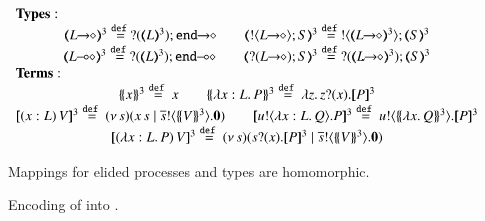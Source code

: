 \begin{figure}[t]
$
{%
\begin{array}{c}
	\multicolumn{1}{l}{\noindent{\bf Types:}}
	\\
	\tmap{\shot{L}}{3} \defeq \shot{\btinp{\tmap{L}{3}} \tinact}
	\qquad
	\tmap{\btout{\shot{L}} S}{3} \defeq \btout{\tmap{\shot{L}}{3}} \tmap{S}{3}
	\\
	\tmap{\lhot{L}}{3} \defeq \lhot{\btinp{\tmap{L}{3}} \tinact}
	\qquad \tmap{\btinp{\shot{L}} S}{3} \defeq \btinp{\tmap{\shot{L}}{3}} \tmap{S}{3}
	\\
	\multicolumn{1}{l}{\noindent{\bf Terms:}}
	\\
	\auxmap{x}{3} \defeq x
	\qquad
	\auxmap{\abs{x: L}{P}}{3} \defeq \abs{z}{\binp{z}{x} \pmap{P}{3}}
	\\
	\pmap{\appl{(x:L)}{V}}{3} \defeq \newsp{s}{\appl{x}{s} \Par \bout{\dual{s}}{\auxmap{V}{3}} \inact}
	\qquad
	\pmap{\bout{u}{\abs{x: L}{Q}} P}{3} \defeq \bout{u}{\auxmap{\abs{x}{Q}}{3} } \pmap{P}{3}
	\\
	\pmap{\appl{(\abs{x: L}{P})}{V}}{3} \defeq \newsp{s}{\binp{s}{x} \pmap{P}{3} \Par  \bout{\dual{s}}{\auxmap{V}{3}} \inact}
\end{array}
}
$

Mappings for elided processes and types are homomorphic.

\caption{\label{f:enc:hopip_to_hopi} Encoding of \HOpp into \HOp.}
\end{figure} 
